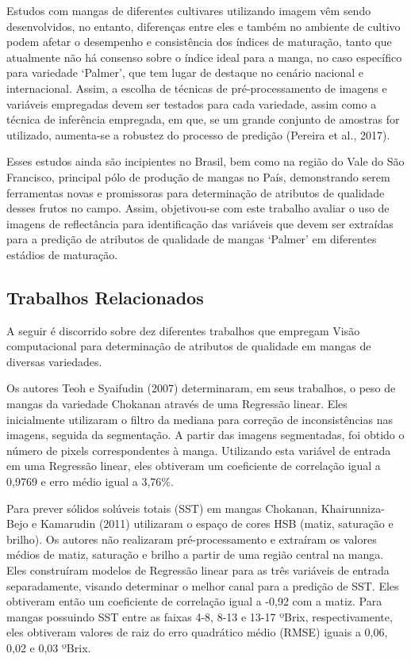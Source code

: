 Estudos com mangas de diferentes cultivares utilizando imagem vêm sendo desenvolvidos, no entanto, diferenças entre eles e também no ambiente de cultivo podem afetar o desempenho e consistência dos índices de maturação, tanto que atualmente não há consenso sobre o índice ideal para a manga, no caso específico para variedade ‘Palmer’, que tem lugar de destaque no cenário nacional e internacional. Assim, a escolha de técnicas de pré-processamento de imagens e variáveis empregadas devem ser testados para cada variedade, assim como a técnica de inferência empregada, em que, se um grande conjunto de amostras for utilizado, aumenta-se a robustez do processo de predição (Pereira et al., 2017).

Esses estudos ainda são incipientes no Brasil, bem como na região do Vale do São Francisco, principal pólo de produção de mangas no País, demonstrando serem ferramentas novas e promissoras para determinação de atributos de qualidade desses frutos no campo. Assim, objetivou-se com este trabalho avaliar o uso de imagens de reflectância para identificação das variáveis que devem ser extraídas para a predição de atributos de qualidade de mangas ‘Palmer’ em diferentes estádios de maturação.

\subsection{Trabalhos Relacionados}
A seguir é discorrido sobre dez diferentes trabalhos que empregam Visão computacional para determinação de atributos de qualidade em mangas de diversas variedades.

Os autores Teoh e Syaifudin (2007) determinaram, em seus trabalhos, o peso de mangas da variedade Chokanan através de uma Regressão linear. Eles inicialmente utilizaram o filtro da mediana para correção de inconsistências nas imagens, seguida da segmentação. A partir das imagens segmentadas, foi obtido o número de pixels correspondentes à manga. Utilizando esta variável de entrada em uma Regressão linear, eles obtiveram um coeficiente de correlação igual a 0,9769 e erro médio igual a 3,76\%.

Para prever sólidos solúveis totais (SST) em mangas Chokanan, Khairunniza-Bejo e Kamarudin (2011) utilizaram o espaço de cores HSB (matiz, saturação e brilho). Os autores não realizaram pré-processamento e extraíram os valores médios de matiz, saturação e brilho a partir de uma região central na manga. Eles construíram modelos de Regressão linear para as três variáveis de entrada separadamente, visando determinar o melhor canal para a predição de SST. Eles obtiveram então um coeficiente de correlação igual a -0,92 com a matiz. Para mangas possuindo SST entre as faixas 4-8, 8-13 e 13-17 ºBrix, respectivamente, eles obtiveram valores de raiz do erro quadrático médio (RMSE) iguais a 0,06, 0,02 e 0,03 ºBrix.

